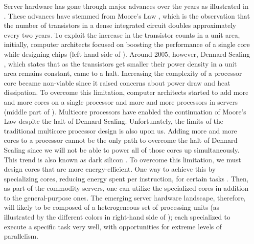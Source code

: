 \documentclass[11pt]{article}
\begin{document}
Server hardware has gone through major advances over the years as illustrated in .
These advances have stemmed from Moore’s Law \cite{Moore65},
which is the observation that the number of transistors in a dense integrated circuit doubles approximately every two years.
To exploit the increase in the transistor counts in a unit area, initially,
computer architects focused on boosting the performance of a single core while designing chips
(left-hand side of ).
Around 2005, however, Dennard Scaling \cite{DennardGYRBAL74},
which states that as the transistors get smaller their power density in a unit area remains constant, came to a halt.
Increasing the complexity of a processor core became non-viable since it raised concerns about power draw and heat dissipation.
To overcome this limitation, computer architects started to add more and more cores on a single processor \cite{OlukotunNHWC96}
and more and more processors in servers (middle part of ).
Multicore processors have enabled the continuation of Moore’s Law despite the halt of Dennard Scaling.
Unfortunately, the limits of the traditional multicore processor design is also upon us. 
Adding more and more cores to a processor cannot be the only path to overcome the halt of Dennard Scaling
since we will not be able to power all of those cores up simultaneously.
This trend is also known as dark silicon \cite{EsmaeilzadehBASB11}.
To overcome this limitation, we must design cores that are more energy-efficient.
One way to achieve this by specializing cores, reducing energy spent per instruction, for certain tasks \cite{HennessyP19}.
Then, as part of the commodity servers, one can utilize the specialized cores in addition to the general-purpose ones.
The emerging server hardware landscape, therefore,
will likely to be composed of a heterogeneous set of processing units
(as illustrated by the different colors in right-hand side of );
each specialized to execute a specific task very well,
with opportunities for extreme levels of parallelism.
\end{document}
